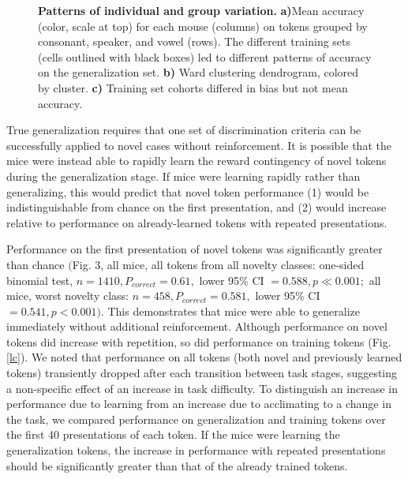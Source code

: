 \documentclass[11pt]{article}\usepackage[]{graphicx}\usepackage[]{color}
\begin{document}
\begin{figure}[!t]
\caption{\label{heat}{\textbf{Patterns of individual and group variation.} \textbf{a)}Mean accuracy (color, scale at top) for each mouse (columns) on tokens grouped by consonant, speaker, and vowel (rows). The different training sets (cells outlined with black boxes) led to different patterns of accuracy on the generalization set. \textbf{b)} Ward clustering dendrogram, colored by cluster. \textbf{c)} Training set cohorts differed in bias but not mean accuracy.
\vspace{48pt}
}}
\end{figure}

True generalization requires that one set of discrimination criteria can be successfully applied to novel cases without reinforcement. It is possible that the mice were instead able to rapidly learn the reward contingency of novel tokens during the generalization stage. If mice were learning rapidly rather than generalizing, this would predict that novel token performance (1) would be indistinguishable from chance on the first presentation, and (2) would increase relative to performance on already-learned tokens with repeated presentations.

Performance on the first presentation of novel tokens was significantly greater than chance $($Fig. 3, all mice, all tokens from all novelty classes: one-sided binomial test, $n=1410, P_{correct} = 0.61,$ lower 95\% CI $= 0.588, p \ll 0.001;$ all mice, worst novelty class:  $n=458, P_{correct} = 0.581,$ lower 95\% CI $= 0.541, p < 0.001)$. This demonstrates that mice were able to generalize immediately without additional reinforcement. Although performance on novel tokens did increase with repetition, so did performance on training tokens (Fig. \ref{lc}). We noted that performance on all tokens (both novel and previously learned tokens) transiently dropped after each transition between task stages, suggesting a non-specific effect of an increase in task difficulty. To distinguish an increase in performance due to learning from an increase due to acclimating to a change in the task, we compared performance on generalization and training tokens over the first 40 presentations of each token. If the mice were learning the generalization tokens, the increase in performance with repeated presentations should be significantly greater than that of the already trained tokens.
\end{document}
